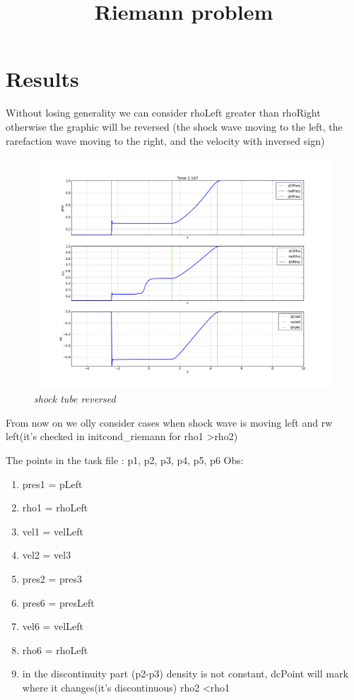 \documentclass[12pt]{book}
\title{Riemann problem}
\date{}
\begin{document}
\section*{Results}

Without losing generality we can consider rhoLeft greater than rhoRight otherwise the graphic will be reversed 
(the shock wave moving to the left, the rarefaction wave moving to the right, and the velocity with inversed sign)

\begin{figure}[!h]
 \centering
 \includegraphics[scale=0.4]{reverse.png}
	\caption{\emph{shock tube reversed}}
 \label{Fig: 1}
\end{figure}

From now on we olly consider cases when shock wave is moving left and rw left(it's checked in initcond\_riemann for rho1 \textgreater rho2) 

The points in the task file : p1, p2, p3, p4, p5, p6
Obs:
\begin{enumerate}
	\item pres1 = pLeft
	\item rho1 = rhoLeft
	\item vel1 = velLeft
	\item vel2 = vel3
	\item pres2 = pres3
	\item pres6 = presLeft
	\item vel6 = velLeft
	\item rho6 = rhoLeft
	\item in the discontinuity part (p2-p3) density is not constant, dcPoint will mark where it changes(it's discontinuous) rho2 \textless rho1
	
\end{enumerate}
\end{document}
